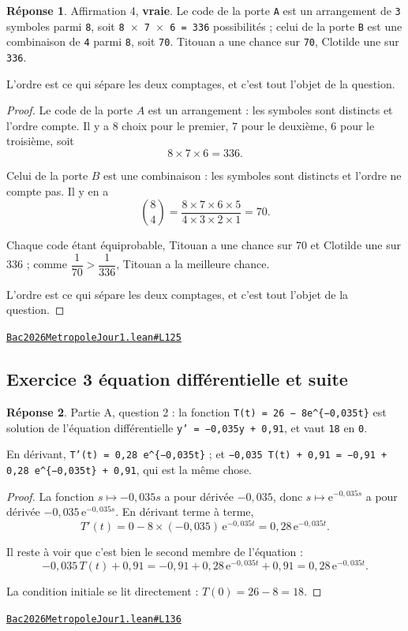 \documentclass[11pt,a4paper]{article}
\theoremstyle{definition}
\theoremstyle{plain}
\theoremstyle{definition}
\newtheorem*{reponse}{Réponse}
\newcommand{\source}[2]{\par\smallskip\noindent\hfill{\footnotesize\href{#1}{\texttt{#2}}}\par\smallskip}
\begin{document}
\begin{reponse}
Affirmation 4, \textbf{vraie}. Le code de la porte \texttt{A} est un arrangement de \texttt{3}
symboles parmi \texttt{8}, soit \texttt{8 \(\times\) 7 \(\times\) 6 = 336} possibilités ; celui de la porte \texttt{B} est
une combinaison de \texttt{4} parmi \texttt{8}, soit \texttt{70}. Titouan a une chance sur \texttt{70}, Clotilde
une sur \texttt{336}.

L'ordre est ce qui sépare les deux comptages, et c'est tout l'objet de la question.
\end{reponse}
\begin{proof}
Le code de la porte $A$ est un arrangement : les symboles sont distincts et l'ordre
compte. Il y a $8$ choix pour le premier, $7$ pour le deuxième, $6$ pour le troisième,
soit
\[ 8 \times 7 \times 6 = 336 . \]

Celui de la porte $B$ est une combinaison : les symboles sont distincts et l'ordre ne
compte pas. Il y en a
\[ \binom{8}{4} = \frac{8 \times 7 \times 6 \times 5}{4 \times 3 \times 2 \times 1} = 70 . \]

Chaque code étant équiprobable, Titouan a une chance sur $70$ et Clotilde une sur $336$ ;
comme $\dfrac{1}{70} > \dfrac{1}{336}$, Titouan a la meilleure chance.

L'ordre est ce qui sépare les deux comptages, et c'est tout l'objet de la question.
\end{proof}
\source{https://github.com/Commutator-IO/learn-lean/blob/main/exams/2026/Bac2026MetropoleJour1.lean\#L125}{Bac2026MetropoleJour1.lean\#L125}

\subsection{Exercice 3 \textemdash{} équation différentielle et suite}

\begin{reponse}
Partie A, question 2 : la fonction \texttt{T(t) = 26 − 8e\textasciicircum{}\{−0,035t\}} est solution de
l'équation différentielle \texttt{y' = −0,035y + 0,91}, et vaut \texttt{18} en \texttt{0}.

En dérivant, \texttt{T'(t) = 0,28 e\textasciicircum{}\{−0,035t\}} ; et
\texttt{−0,035 T(t) + 0,91 = −0,91 + 0,28 e\textasciicircum{}\{−0,035t\} + 0,91}, qui est la même chose.
\end{reponse}
\begin{proof}
La fonction $s \mapsto -0{,}035s$ a pour dérivée $-0{,}035$, donc $s \mapsto
\mathrm{e}^{-0{,}035s}$ a pour dérivée $-0{,}035\,\mathrm{e}^{-0{,}035s}$. En dérivant
terme à terme,
\[ T'(t) = 0 - 8 \times (-0{,}035)\,\mathrm{e}^{-0{,}035t}
   = 0{,}28\,\mathrm{e}^{-0{,}035t} . \]

Il reste à voir que c'est bien le second membre de l'équation :
\[ -0{,}035\,T(t) + 0{,}91
   = -0{,}91 + 0{,}28\,\mathrm{e}^{-0{,}035t} + 0{,}91
   = 0{,}28\,\mathrm{e}^{-0{,}035t} . \]

La condition initiale se lit directement : $T(0) = 26 - 8 = 18$.
\end{proof}
\source{https://github.com/Commutator-IO/learn-lean/blob/main/exams/2026/Bac2026MetropoleJour1.lean\#L136}{Bac2026MetropoleJour1.lean\#L136}
\end{document}
